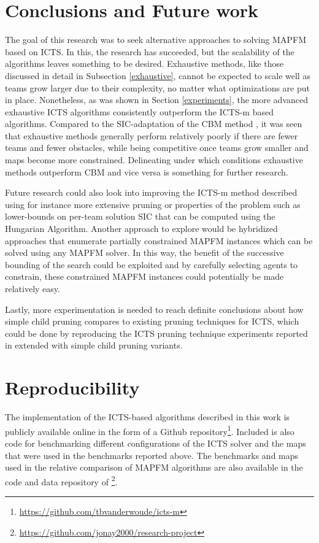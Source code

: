 \documentclass[english]{article}
\begin{document}
	\section{Conclusions and Future work}
	\label{conclusions}
	\label{future}
	The goal of this research was to seek alternative approaches to solving MAPFM based on ICTS. In this, the research has succeeded, but the scalability of the algorithms leaves something to be desired. Exhaustive methods, like those discussed in detail in Subsection \ref{exhaustive}, cannot be expected to scale well as teams grow larger due to their complexity, no matter what optimizations are put in place. Nonetheless, as was shown in Section \ref{experiments}, the more advanced exhaustive ICTS algorithms consistently outperform the ICTS-m based algorithms. Compared to the SIC-adaptation of the CBM method \cite{baauw2021}, it was seen that exhaustive methods generally perform relatively poorly if there are fewer teams and fewer obstacles, while being competitive once teams grow smaller and maps become more constrained. Delineating under which conditions exhaustive methods outperform CBM and vice versa is something for further research.
	
	Future research could also look into improving the ICTS-m method described using for instance more extensive pruning or properties of the problem such as lower-bounds on per-team solution SIC that can be computed using the Hungarian Algorithm. Another approach to explore would be hybridized approaches that enumerate partially constrained MAPFM instances which can be solved using any MAPFM solver. In this way, the benefit of the successive bounding of the search could be exploited and by carefully selecting agents to constrain, these constrained MAPFM instances could potentially be made relatively easy.
	
	Lastly, more experimentation is needed to reach definite conclusions about how simple child pruning compares to existing pruning techniques for ICTS, which could be done by reproducing the ICTS pruning technique experiments reported in \cite{sharon2011} extended with simple child pruning variants. %
	
	\section{Reproducibility}
	The implementation of the ICTS-based algorithms described in this work is publicly available online in the form of a Github repository\footnote{\url{https://github.com/tbvanderwoude/icts-m}}. Included is also code for benchmarking different configurations of the ICTS solver and the maps that were used in the benchmarks reported above. The benchmarks and maps used in the relative comparison of MAPFM algorithms are also available in the code and data repository of \cite{donszelmann2021}\footnote{\url{https://github.com/jonay2000/research-project}}.
	
\end{document}
